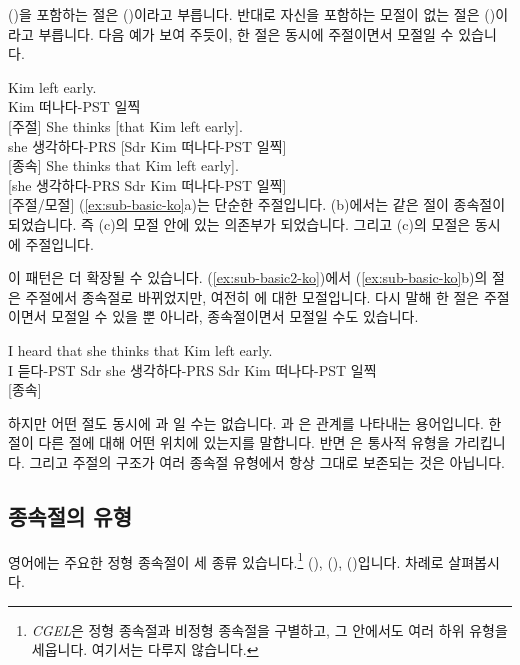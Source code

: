 ()을 포함하는 절은 ()이라고 부릅니다. 반대로 자신을 포함하는 모절이 없는 절은 ()이라고 부릅니다. 다음 예가 보여 주듯이, 한 절은 동시에 주절이면서 모절일 수 있습니다.

\ea \label{ex:sub-basic-ko}
    \ea \gll Kim left early.\\
        Kim 떠나다-PST 일찍\\
    \glt {} [주절]
    \ex \gll She thinks {[}that Kim left early{]}.\\
        she 생각하다-PRS {[}Sdr Kim 떠나다-PST 일찍{]}\\
    \glt {} [종속]
    \ex \gll {[}She thinks that Kim left early{]}.\\
        {[}she 생각하다-PRS Sdr Kim 떠나다-PST 일찍{]}\\
    \glt {} [주절/모절]
    \z
\z
(\ref{ex:sub-basic-ko}a)는 단순한 주절입니다. (b)에서는 같은 절이 종속절이 되었습니다. 즉 (c)의 모절 안에 있는 의존부가 되었습니다. 그리고 (c)의 모절은 동시에 주절입니다.

이 패턴은 더 확장될 수 있습니다. (\ref{ex:sub-basic2-ko})에서 (\ref{ex:sub-basic-ko}b)의 절은 주절에서 종속절로 바뀌었지만, 여전히 에 대한 모절입니다. 다시 말해 한 절은 주절이면서 모절일 수 있을 뿐 아니라, 종속절이면서 모절일 수도 있습니다.

\ea\label{ex:sub-basic2-ko}
\gll I heard {\ob}that she thinks {\ob}that Kim left early{\cb}{\cb}.\\
    I 듣다-PST Sdr she 생각하다-PRS Sdr Kim 떠나다-PST 일찍\\
\glt {} [종속]
\z

하지만 어떤 절도 동시에 과 일 수는 없습니다. 과 은 관계를 나타내는 용어입니다. 한 절이 다른 절에 대해 어떤 위치에 있는지를 말합니다. 반면 은 통사적 유형을 가리킵니다. 그리고 주절의 구조가 여러 종속절 유형에서 항상 그대로 보존되는 것은 아닙니다.

\subsection{종속절의 유형}

영어에는 주요한 정형 종속절이 세 종류 있습니다.\footnote{\textit{CGEL}은 정형 종속절과 비정형 종속절을 구별하고, 그 안에서도 여러 하위 유형을 세웁니다. 여기서는 다루지 않습니다.} (), (), ()입니다. 차례로 살펴봅시다.

